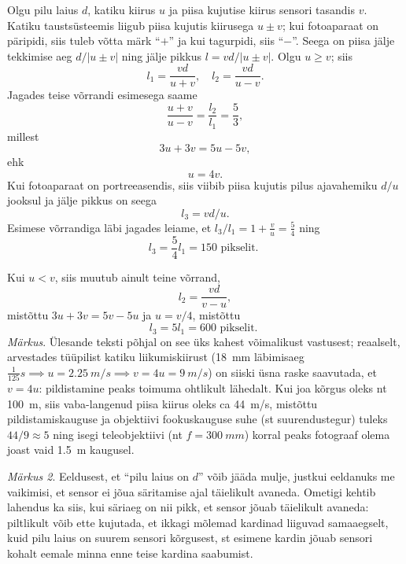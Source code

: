 \documentclass[10pt, twoside]{article}
\begin{document}
{%

\solu
Olgu pilu laius $d$, katiku kiirus $u$ ja piisa kujutise kiirus sensori tasandis $v$. Katiku
taustsüsteemis liigub piisa kujutis kiirusega $u \pm v$; kui fotoaparaat on päripidi, siis tuleb võtta märk \enquote{$+$} ja kui tagurpidi, siis \enquote{$-$}. Seega on piisa jälje tekkimise aeg
$d/|u \pm v|$ ning jälje pikkus $l = vd/|u \pm v|$. Olgu $u \geq v$; siis
\[
l_{1}=\frac{v d}{u+v}, \quad l_{2}=\frac{v d}{u-v}.
\]
Jagades teise võrrandi esimesega saame 
\[
\frac{u+v}{u-v}=\frac{l_{2}}{l_{1}}=\frac{5}{3},
\]
millest
\[
3u+ 3v = 5u-5v,
\]
ehk
\[
u = 4v.
\]
Kui fotoaparaat on portreeasendis, siis viibib piisa kujutis pilus ajavahemiku
$d/u$ jooksul ja jälje pikkus on seega
\[
l_3 = vd/u.
\]
Esimese võrrandiga läbi jagades leiame, et $l_3/l_1 = 1 + \frac{v}{u} = \frac{5}{4}$
ning
\[
l_{3}=\frac{5}{4} l_{1}=150 \text { pikselit. }
\]

Kui $u < v$, siis muutub ainult teine võrrand,
\[
l_2 = \frac{vd}{v - u},
\]
mistõttu $3u + 3v = 5v - 5u$ ja $u = v/4$, mistõttu
\[
l_{3}=5 l_{1}=600 \text { pikselit. }
\]
\emph{Märkus}. Ülesande teksti põhjal on see üks kahest võimalikust vastusest; reaalselt, arvestades tüüpilist katiku liikumiskiirust (\SI{18}{mm} läbimisaeg $\frac{1}{125}\si{s} \implies u = \SI{2,25}{m/s} \implies v = 4u = \SI{9}{m/s}$) on siiski üsna raske saavutada, et $v = 4u$: pildistamine peaks toimuma ohtlikult lähedalt. Kui joa kõrgus oleks nt \SI{100}{m}, siis vaba-langenud piisa
kiirus oleks ca \SI{44}{m/s}, mistõttu pildistamiskauguse ja objektiivi fookuskauguse suhe
(st suurendustegur) tuleks $44/9 \approx 5$ ning isegi teleobjektiivi (nt $f = \SI{300}{mm}$) korral
peaks fotograaf olema joast vaid \SI{1,5}{m} kaugusel.

\emph{Märkus 2}. Eeldusest, et \enquote{pilu laius on $d$} võib jääda mulje, justkui eeldanuks me
vaikimisi, et sensor ei jõua säritamise ajal täielikult avaneda. Ometigi kehtib lahendus
ka siis, kui säriaeg on nii pikk, et sensor jõuab täielikult avaneda: piltlikult võib
ette kujutada, et ikkagi mõlemad kardinad liiguvad samaaegselt, kuid pilu laius on
suurem sensori kõrgusest, st esimene kardin jõuab sensori kohalt eemale minna enne
teise kardina saabumist.
\probend
\bigskip


}
\end{document}
